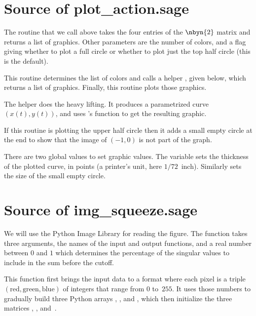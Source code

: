 \section{Source of plot\_action.sage}

The 
routine that we call above takes the four entries of the $\nbyn{2}$
matrix and returns a list of graphics.
Other parameters are the number of colors, and a flag giving whether
to plot a full circle or whether to plot just the top half circle (this
is the default).

This routine determines the list of colors and 
calls a helper , 
given below, which returns a list of graphics.
Finally, this routine plots those graphics.


The helper does the heavy lifting.
It produces a parametrized curve $(x(t),y(t))$, and uses \Sage's
 function to get the resulting graphic.

If this routine is plotting the upper half circle then it adds a
small empty circle at the end to show that the image of $(-1,0)$
is not part of the graph.

There are two global values to set graphic values.
The variable  sets the thickness of 
the plotted curve, in points (a printer's unit, here $1/72$~inch).
Similarly  sets the size of the small empty circle.



\section{Source of img\_squeeze.sage}
We will use the Python Image Library for reading the figure.
The function
takes three arguments, the names of the input and output functions, and
a real number between $0$ and $1$ which determines the percentage 
of the singular values to include in the sum before the cutoff.

This function first brings the input data to a format where each
pixel is a triple 
$(\text{red}, \text{green},\text{blue})$ of integers that range from 
$0$ to~$255$.
It uses those numbers to gradually build 
three Python arrays , ,
and , which then initialize the 
three \Sage{} matrices ,
, and~.


